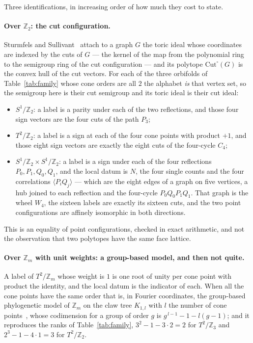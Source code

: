 \documentclass[11pt,a4paper]{article}
\theoremstyle{definition}
\newcommand{\ZZ}{\mathbb{Z}}
\begin{document}
Three identifications, in increasing order of how much they cost to state.

\paragraph{Over $\ZZ_2$: the cut configuration.} Sturmfels and Sullivant~\cite{SScuts} attach to a
graph $G$ the toric ideal whose coordinates are indexed by the cuts of $G$ --- the kernel of the map
from the polynomial ring to the semigroup ring of the cut configuration --- and its polytope
$\mathrm{Cut}^\square(G)$ is the convex hull of the cut vectors. For each of the three orbifolds of
Table~\ref{tab:family} whose cone orders are all $2$ the alphabet \emph{is} that vertex set, so the
semigroup here is their cut semigroup and its toric ideal is their cut ideal:

\begin{itemize}\itemsep2pt
\item $S^1/\ZZ_2$: a label is a parity under each of the two reflections, and those four sign
vectors are the four cuts of the path $P_3$;
\item $T^2/\ZZ_2$: a label is a sign at each of the four cone points with product $+1$, and those
eight sign vectors are exactly the eight cuts of the four-cycle $C_4$;
\item $S^1/\ZZ_2\times S^1/\ZZ_2$: a label is a sign under each of the four reflections
$P_0,P_1,Q_0,Q_1$, and the local datum is $N$, the four single counts and the four correlations
$\langle P_iQ_j\rangle$ --- which are the eight edges of a graph on five vertices, a hub joined to
each reflection and the four-cycle $P_0Q_0P_1Q_1$. That graph is the wheel $W_4$, the sixteen labels
are exactly its sixteen cuts, and the two point configurations are affinely isomorphic in both
directions.
\end{itemize}

\noindent
This is an equality of point configurations, checked in exact arithmetic, and not the observation
that two polytopes have the same face lattice.

\paragraph{Over $\ZZ_m$ with unit weights: a group-based model, and then not quite.} A label of
$T^2/\ZZ_m$ whose weight is $1$ is one root of unity per cone point with product the identity, and
the local datum is the indicator of each. When all the cone points have the same order that is, in
Fourier coordinates, the group-based phylogenetic model of $\ZZ_m$ on the claw tree $K_{1,l}$ with
$l$ the number of cone points~\cite{SSphylo}, whose codimension for a group of order $g$ is
$g^{\,l-1}-1-l(g-1)$; and it reproduces the ranks of Table~\ref{tab:family}, $3^2-1-3\cdot2=2$ for
$T^2/\ZZ_3$ and $2^3-1-4\cdot1=3$ for $T^2/\ZZ_2$.
\end{document}
